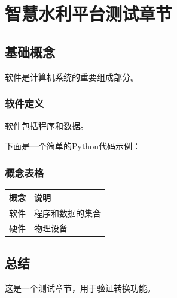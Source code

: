 \section{智慧水利平台测试章节}\label{ux667aux6167ux6c34ux5229ux5e73ux53f0ux6d4bux8bd5ux7ae0ux8282}

\subsection{基础概念}\label{ux57faux7840ux6982ux5ff5}

软件是计算机系统的重要组成部分。

\subsubsection{软件定义}\label{ux8f6fux4ef6ux5b9aux4e49}

软件包括程序和数据。

下面是一个简单的Python代码示例：

\begin{Shaded}
\begin{Highlighting}[]
    \NormalTok{(}\NormalTok{)}
     
\end{Highlighting}
\end{Shaded}

\subsubsection{概念表格}\label{ux6982ux5ff5ux8868ux683c}

\begin{longtable}[]{@{}ll@{}}
\toprule\noalign{}
概念 & 说明 \\
\midrule\noalign{}
\endhead
\bottomrule\noalign{}
\endlastfoot
软件 & 程序和数据的集合 \\
硬件 & 物理设备 \\
\end{longtable}

\subsection{总结}\label{ux603bux7ed3}

这是一个测试章节，用于验证转换功能。
